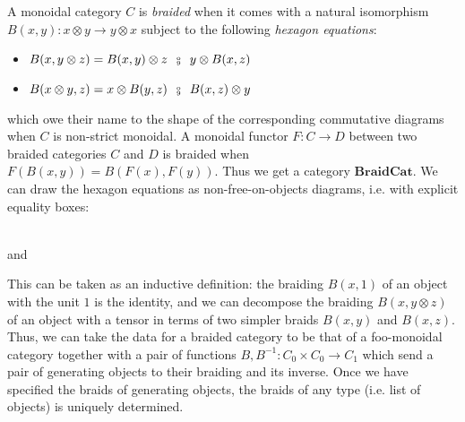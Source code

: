 A monoidal category $C$ is \emph{braided} when it comes with a natural isomorphism $B(x, y) : x \otimes y \to y \otimes x$ subject to the following \emph{hexagon equations}:
\begin{itemize}
\item $B(x, y \otimes z) = B(x,y) \otimes z \s \fcmp \s y \otimes B(x,z)$
\item $B(x \otimes y, z) = x \otimes B(y,z) \s \fcmp \s B(x,z) \otimes y$
\end{itemize}
which owe their name to the shape of the corresponding commutative diagrams when $C$ is non-strict monoidal.
A monoidal functor $F : C \to D$ between two braided categories $C$ and $D$ is braided when $F(B(x, y)) = B(F(x), F(y))$.
Thus we get a category $\mathbf{BraidCat}$.
We can draw the hexagon equations as non-free-on-objects diagrams, i.e. with explicit equality boxes:
\begin{center}
\\
\vspace{10pt}
and \hspace{10pt} 
\end{center}
This can be taken as an inductive definition: the braiding $B(x,1)$ of an object with the unit $1$ is the identity, and we can decompose the braiding $B(x, y \otimes z)$ of an object with a tensor in terms of two simpler braids $B(x,y)$ and $B(x,z)$.
Thus, we can take the data for a braided category to be that of a foo-monoidal category together with a pair of functions $B, B^{-1} : C_0 \times C_0 \to C_1$ which send a pair of generating objects to their braiding and its inverse.
Once we have specified the braids of generating objects, the braids of any type (i.e. list of objects) is uniquely determined.

